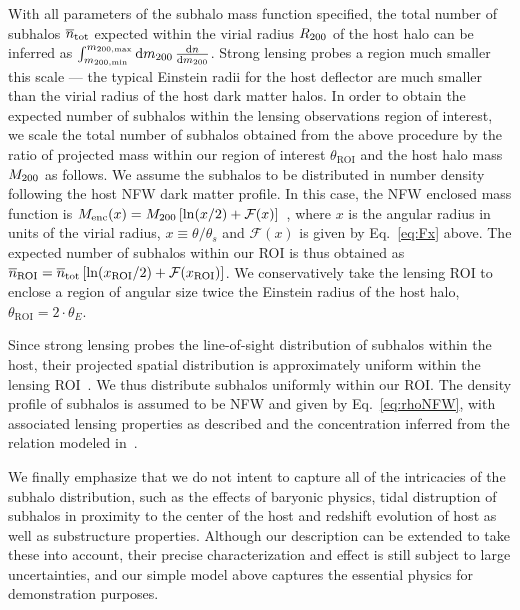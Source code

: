 \documentclass[twocolumn]{aastex62}
\begin{document}
With all parameters of the subhalo mass function specified, the total number of subhalos $\mean{n}_{\mathrm{tot}}$ expected within the virial radius $R_{200}$ of the host halo can be inferred as $\int_{m_\mathrm{200, min}}^{m_\mathrm{200, max}}\mathrm{d} m_{200}\,\frac{\mathrm{d} n}{\mathrm{d} m_{200}}$. Strong lensing probes a region much smaller this scale --- the typical Einstein radii for the host deflector are much smaller than the virial radius of the host dark matter halos. In order to obtain the expected number of subhalos within the lensing observations region of interest, we scale the total number of subhalos obtained from the above procedure by the ratio of projected mass within our region of interest $\theta_\textrm{ROI}$ and the host halo mass $M_{200}$ as follows. We assume the subhalos to be distributed in number density following the host NFW dark matter profile. In this case, the NFW enclosed mass function is $M_\mathrm{enc}(x) = M_{200}\left[\ln(x/2) + \mathcal{F}(x)\right]$~\citep{2001astro.ph..2341K}, where $x$ is the angular radius in units of the virial radius, $x\equiv \theta/\theta_s$ and $\mathcal{F}(x)$ is given by Eq.~\ref{eq:Fx} above. The expected number of subhalos within our ROI is thus obtained as $\mean n_\mathrm{ROI} = \mean n_\mathrm{tot}\left[\ln(x_\mathrm{ROI}/2) + \mathcal{F}(x_\mathrm{ROI})\right]$. We conservatively take the lensing ROI to enclose a region of angular size twice the Einstein radius of the host halo, $\theta_\mathrm{ROI} = 2\cdot\theta_E$.

Since strong lensing probes the line-of-sight distribution of subhalos within the host, their projected spatial distribution is approximately uniform within the lensing ROI~\citep{2017MNRAS.469.1997D}. We thus distribute subhalos uniformly within our ROI. The density profile of subhalos is assumed to be NFW and given by Eq.~\ref{eq:rhoNFW}, with associated lensing properties as described and the concentration inferred from the relation modeled in~\citet{2014MNRAS.442.2271S}.

We finally emphasize that we do not intent to capture all of the intricacies of the subhalo distribution, such as the effects of baryonic physics, tidal distruption of subhalos in proximity to the center of the host and redshift evolution of host as well as substructure properties. Although our description can be extended to take these into account, their precise characterization and effect is still subject to large uncertainties, and our simple model above captures the essential physics for demonstration purposes.
\end{document}
